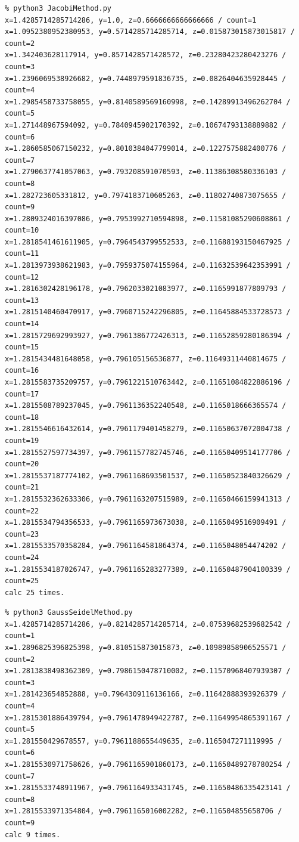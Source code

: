 \documentclass[a4paper, titlepage]{jsarticle}
\begin{document}
		
		\begin{lstlisting}
% python3 JacobiMethod.py 
x=1.4285714285714286, y=1.0, z=0.6666666666666666 / count=1
x=1.0952380952380953, y=0.5714285714285714, z=0.015873015873015817 / count=2
x=1.342403628117914, y=0.8571428571428572, z=0.23280423280423276 / count=3
x=1.2396069538926682, y=0.7448979591836735, z=0.0826404635928445 / count=4
x=1.2985458733758055, y=0.8140589569160998, z=0.14289913496262704 / count=5
x=1.271448967594092, y=0.7840945902170392, z=0.10674793138889882 / count=6
x=1.2860585067150232, y=0.8010384047799014, z=0.1227575882400776 / count=7
x=1.2790637741057063, y=0.793208591070593, z=0.11386308580336103 / count=8
x=1.282723605331812, y=0.7974183710605263, z=0.11802740873075655 / count=9
x=1.2809324016397086, y=0.7953992710594898, z=0.11581085290608861 / count=10
x=1.2818541461611905, y=0.7964543799552533, z=0.11688193150467925 / count=11
x=1.2813973938621983, y=0.7959375074155964, z=0.11632539642353991 / count=12
x=1.2816302428196178, y=0.7962033021083977, z=0.1165991877809793 / count=13
x=1.2815140460470917, y=0.7960715242296805, z=0.11645884533728573 / count=14
x=1.2815729692993927, y=0.7961386772426313, z=0.11652859280186394 / count=15
x=1.2815434481648058, y=0.796105156536877, z=0.11649311440814675 / count=16
x=1.2815583735209757, y=0.7961221510763442, z=0.11651084822886196 / count=17
x=1.2815508789237045, y=0.7961136352240548, z=0.1165018666365574 / count=18
x=1.2815546616432614, y=0.7961179401458279, z=0.11650637072004738 / count=19
x=1.2815527597734397, y=0.7961157782745746, z=0.11650409514177706 / count=20
x=1.2815537187774102, y=0.7961168693501537, z=0.11650523840326629 / count=21
x=1.2815532362633306, y=0.7961163207515989, z=0.11650466159941313 / count=22
x=1.2815534794356533, y=0.7961165973673038, z=0.1165049516909491 / count=23
x=1.2815533570358284, y=0.7961164581864374, z=0.1165048054474202 / count=24
x=1.2815534187026747, y=0.7961165283277389, z=0.11650487904100339 / count=25
calc 25 times.
		\end{lstlisting}
		
		\begin{lstlisting}
% python3 GaussSeidelMethod.py
x=1.4285714285714286, y=0.8214285714285714, z=0.07539682539682542 / count=1
x=1.2896825396825398, y=0.810515873015873, z=0.10989858906525571 / count=2
x=1.2813838498362309, y=0.7986150478710002, z=0.11570968407939307 / count=3
x=1.281423654852888, y=0.7964309116136166, z=0.11642888393926379 / count=4
x=1.2815301886439794, y=0.7961478949422787, z=0.11649954865391167 / count=5
x=1.281550429678557, y=0.7961188655449635, z=0.1165047271119995 / count=6
x=1.2815530971758626, y=0.7961165901860173, z=0.11650489278780254 / count=7
x=1.2815533748911967, y=0.7961164933431745, z=0.11650486335423141 / count=8
x=1.2815533971354804, y=0.7961165016002282, z=0.116504855658706 / count=9
calc 9 times.
		\end{lstlisting}
\end{document}
